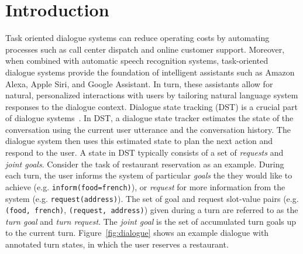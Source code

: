 \documentclass[11pt,a4paper]{article}
\title{\papertitle}
\author{Victor Zhong, Caiming Xiong, Richard Socher \\
  Salesforce Research\\
  Palo Alto, CA \\
  {\tt \{vzhong, cxiong, rsocher\}@salesforce.com}
}
\date{}
\newcommand{\modelnameshort}{GLAD}
\newcommand{\sota}{state-of-the-art}
\newcommand{\goaldiff}{3.7}  \newcommand{\requestdiff}{5.5}  \newcommand{\turngoalacc}{93.1}
\newcommand{\goalacc}{88.1}
\newcommand{\requestacc}{97.1}
\newcommand{\dstcgoaldiff}{1.1}  \newcommand{\dstcrequestdiff}{1.0}  \newcommand{\dstcgoalacc}{74.5}
\newcommand{\dstcrequestacc}{97.5}
\begin{document}
\maketitle




\begin{abstract}
Dialogue state tracking, which estimates user goals and requests given the dialogue context, is an essential part of task-oriented dialogue systems.
In this paper, we propose the \modelname~(\modelnameshort), which learns representations of the user utterance and previous system actions with global-local modules.
Our model uses global modules to share parameters between estimators for different types (called slots) of dialogue states, and uses local modules to learn slot-specific features.
We show that this improves tracking of rare states and achieves \sota~performance on the WoZ and DSTC2 state tracking tasks.
\modelnameshort~obtains \goalacc\% joint goal accuracy and \requestacc\% request accuracy on WoZ, outperforming prior work by \goaldiff\% and \requestdiff\%.
On DSTC2, our model obtains \dstcgoalacc\% joint goal accuracy and \dstcrequestacc\% request accuracy, outperforming prior work by \dstcgoaldiff\% and \dstcrequestdiff\%.
\end{abstract}




\section{Introduction}


Task oriented dialogue systems can reduce operating costs by automating processes such as call center dispatch and online customer support.
Moreover, when combined with automatic speech recognition systems, task-oriented dialogue systems provide the foundation of intelligent assistants such as Amazon Alexa, Apple Siri, and Google Assistant.
In turn, these assistants allow for natural, personalized interactions with users by tailoring natural language system responses to the dialogue context.
Dialogue state tracking (DST) is a crucial part of dialogue systems~\citep{young2013POMDPDialogueReview}.
In DST, a dialogue state tracker estimates the state of the conversation using the current user utterance and the conversation history.
The dialogue system then uses this estimated state to plan the next action and respond to the user.
A state in DST typically consists of a set of \textit{requests} and \textit{joint goals}.
Consider the task of restaurant reservation as an example.
During each turn, the user informs the system of particular \textit{goals} the they would like to achieve (e.g. \texttt{inform(food=french)}), or \textit{request} for more information from the system (e.g. \texttt{request(address)}).
The set of goal and request slot-value pairs (e.g. \texttt{(food, french)}, \texttt{(request, address)}) given during a turn are referred to as the \textit{turn goal} and \textit{turn request}.
The \textit{joint goal} is the set of accumulated turn goals up to the current turn.
Figure~\ref{fig:dialogue} shows an example dialogue with annotated turn states, in which the user reserves a restaurant.
\end{document}
